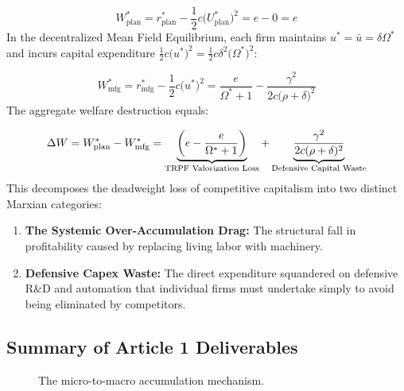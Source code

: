\documentclass[11pt,letterpaper]{report}
\newcommand{\fitmath}[1]{\begingroup\setbox0=\hbox{$\displaystyle #1$}\ifdim\wd0>\linewidth\resizebox{\linewidth}{!}{$\displaystyle #1$}\else\displaystyle #1\fi\endgroup}
\begin{document}
\[
{W}_{\mathrm{plan}}^{*}={r}_{\mathrm{plan}}^{*}-\frac{1}{2}c({U}_{\mathrm{plan}}^{*}{)}^{2}=e-0=e
\]
In the decentralized Mean Field Equilibrium, each firm maintains ${u}^{*}=\bar{u}=\delta {\Omega }^{*}$ and incurs capital expenditure $\frac{1}{2}c({u}^{*}{)}^{2}=\frac{1}{2}c{\delta }^{2}({\Omega }^{*}{)}^{2}$:

\[
{W}_{\mathrm{mfg}}^{*}={r}_{\mathrm{mfg}}^{*}-\frac{1}{2}c({u}^{*}{)}^{2}=\frac{e}{{\Omega }^{*}+1}-\frac{{\gamma }^{2}}{2c(\rho +\delta {)}^{2}}
\]
The aggregate welfare destruction equals:

\[\fitmath{\Delta W = W_{\text{plan}}^* - W_{\text{mfg}}^* = \underbrace{\left( e - \frac{e}{\Omega^* + 1} \right)}_{\text{TRPF Valorization Loss}} + \underbrace{\frac{\gamma^2}{2 c (\rho + \delta)^2}}_{\text{Defensive Capital Waste}}}\]
This decomposes the deadweight loss of competitive capitalism into two distinct Marxian categories:

\begin{enumerate}
\item \textbf{The Systemic Over-Accumulation Drag:} The structural fall in profitability caused by replacing living labor with machinery.
\item \textbf{Defensive Capex Waste:} The direct expenditure squandered on defensive R\&D and automation that individual firms must undertake simply to avoid being eliminated by competitors.
\end{enumerate}
\subsection{Summary of Article 1 Deliverables}

\begin{figure}[H]\centering
{}
\caption{The micro-to-macro accumulation mechanism.}
\end{figure}
\end{document}
